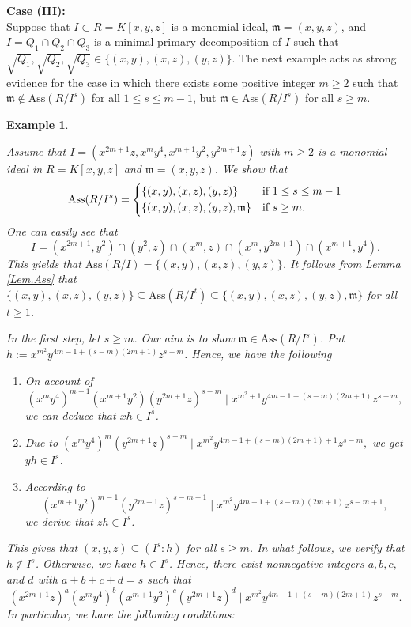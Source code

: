 \documentclass[11pt]{amsart}
\newtheorem{example}[theorem]{Example}
\begin{document}


 \medskip
\noindent\textbf{Case (III):} \\
Suppose that $I\subset R=K[x,y,z]$ is a monomial ideal, $\mathfrak{m}=(x,y,z)$, and $I=Q_1 \cap Q_2 \cap Q_3$
 is a minimal primary decomposition of $I$ such that 
$\sqrt{Q_1} , \sqrt{Q_2}, \sqrt{Q_3}\in \{(x,y), (x,z), (y,z)\}$.    The next  example acts as strong evidence for the case in which there exists some  positive integer  $m\geq 2$ such that  $\mathfrak{m}\notin \mathrm{Ass}(R/I^s)$ for all $1\leq s \leq m-1$,   but  
 $\mathfrak{m}\in \mathrm{Ass}(R/I^s)$ for all $s \geq m$. 


    \medskip
\begin{example} \label{Ex.Ass.NandP.3}
\em{
Assume that  $I=(x^{2m+1}z, x^my^4, x^{m+1}y^2, y^{2m+1}z)$ with $m\geq 2$  is  a monomial ideal in  $R=K[x,y,z]$ and 
$\mathfrak{m}=(x,y,z)$.   We show  that 
\[
\mathrm{Ass}(R/I^s) =
    \begin{dcases}
    \{(x,y), (x,z), (y,z)\} & \text{if } 1\leq s\leq m-1\\
\{(x,y), (x,z), (y,z), \mathfrak{m}\}  & \text{if } s\geq m. \\
                 \end{dcases}
\]
One can easily see that $$I=(x^{2m+1}, y^2) \cap (y^2,z) \cap (x^m,z) \cap (x^m, y^{2m+1}) \cap (x^{m+1}, y^4).$$ 
This yields that $\mathrm{Ass}(R/I)=\{(x,y), (x,z), (y,z)\}$.  It follows from Lemma \ref{Lem.Ass} that
 $ \{(x,y), (x,z), (y,z)\} \subseteq \mathrm{Ass}(R/I^t) \subseteq \{(x,y), (x,z), (y,z), \mathfrak{m}\}$ for all $t\geq 1$. 
 
In the first step, let $s\geq m$. Our aim is to show $\mathfrak{m} \in \mathrm{Ass}(R/I^s)$. 
Put $h:=x^{m^2} y^{4m-1 + (s-m)(2m+1)} z^{s-m}$.  Hence, we have the following 
 \begin{enumerate}
  \item   On account of  $$(x^m y^4)^{m-1} (x^{m+1}y^2) (y^{2m+1}z)^{s-m} \mid x^{m^2+1} y^{4m-1 + (s-m)(2m+1)} z^{s-m},$$
    we can deduce that  $xh \in I^s$. 
  \item   Due to $(x^my^4)^m (y^{2m+1}z)^{s-m} \mid   x^{m^2} y^{4m-1 + (s-m)(2m+1)+1} z^{s-m},$  we get   $yh \in I^s$. 
  \item  According to $$(x^{m+1}y^2)^{m-1} (y^{2m+1}z)^{s-m+1} \mid x^{m^2} y^{4m-1 + (s-m)(2m+1)} z^{s-m+1},$$
   we derive that   $zh \in I^s$.  
  \end{enumerate}
  This gives  that  $(x,y,z) \subseteq (I^s:h)$ for all $s\geq m$. In what follows, we verify that $h\notin I^s$. Otherwise, we have $h\in I^s$. Hence, there exist 
  nonnegative integers $a,b,c,$ and $d$ with   $a+b+c+d=s$    such that 
  $$(x^{2m+1}z)^a  (x^my^4)^b (x^{m+1}y^2)^c  (y^{2m+1}z)^d \mid x^{m^2} y^{4m-1 + (s-m)(2m+1)} z^{s-m}.$$
   In particular, we have the following conditions:
  
}
\end{example}
\end{document}
